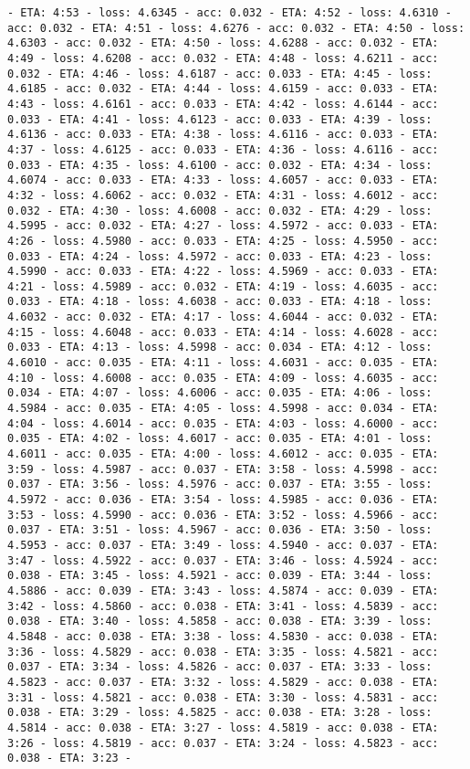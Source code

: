 \documentclass[11pt]{article}
\begin{document}
\begin{Verbatim}[commandchars=\\\{\}]
- ETA: 4:53 - loss: 4.6345 - acc: 0.032 - ETA: 4:52 - loss: 4.6310 - acc: 0.032 - ETA: 4:51 - loss: 4.6276 - acc: 0.032 - ETA: 4:50 - loss: 4.6303 - acc: 0.032 - ETA: 4:50 - loss: 4.6288 - acc: 0.032 - ETA: 4:49 - loss: 4.6208 - acc: 0.032 - ETA: 4:48 - loss: 4.6211 - acc: 0.032 - ETA: 4:46 - loss: 4.6187 - acc: 0.033 - ETA: 4:45 - loss: 4.6185 - acc: 0.032 - ETA: 4:44 - loss: 4.6159 - acc: 0.033 - ETA: 4:43 - loss: 4.6161 - acc: 0.033 - ETA: 4:42 - loss: 4.6144 - acc: 0.033 - ETA: 4:41 - loss: 4.6123 - acc: 0.033 - ETA: 4:39 - loss: 4.6136 - acc: 0.033 - ETA: 4:38 - loss: 4.6116 - acc: 0.033 - ETA: 4:37 - loss: 4.6125 - acc: 0.033 - ETA: 4:36 - loss: 4.6116 - acc: 0.033 - ETA: 4:35 - loss: 4.6100 - acc: 0.032 - ETA: 4:34 - loss: 4.6074 - acc: 0.033 - ETA: 4:33 - loss: 4.6057 - acc: 0.033 - ETA: 4:32 - loss: 4.6062 - acc: 0.032 - ETA: 4:31 - loss: 4.6012 - acc: 0.032 - ETA: 4:30 - loss: 4.6008 - acc: 0.032 - ETA: 4:29 - loss: 4.5995 - acc: 0.032 - ETA: 4:27 - loss: 4.5972 - acc: 0.033 - ETA: 4:26 - loss: 4.5980 - acc: 0.033 - ETA: 4:25 - loss: 4.5950 - acc: 0.033 - ETA: 4:24 - loss: 4.5972 - acc: 0.033 - ETA: 4:23 - loss: 4.5990 - acc: 0.033 - ETA: 4:22 - loss: 4.5969 - acc: 0.033 - ETA: 4:21 - loss: 4.5989 - acc: 0.032 - ETA: 4:19 - loss: 4.6035 - acc: 0.033 - ETA: 4:18 - loss: 4.6038 - acc: 0.033 - ETA: 4:18 - loss: 4.6032 - acc: 0.032 - ETA: 4:17 - loss: 4.6044 - acc: 0.032 - ETA: 4:15 - loss: 4.6048 - acc: 0.033 - ETA: 4:14 - loss: 4.6028 - acc: 0.033 - ETA: 4:13 - loss: 4.5998 - acc: 0.034 - ETA: 4:12 - loss: 4.6010 - acc: 0.035 - ETA: 4:11 - loss: 4.6031 - acc: 0.035 - ETA: 4:10 - loss: 4.6008 - acc: 0.035 - ETA: 4:09 - loss: 4.6035 - acc: 0.034 - ETA: 4:07 - loss: 4.6006 - acc: 0.035 - ETA: 4:06 - loss: 4.5984 - acc: 0.035 - ETA: 4:05 - loss: 4.5998 - acc: 0.034 - ETA: 4:04 - loss: 4.6014 - acc: 0.035 - ETA: 4:03 - loss: 4.6000 - acc: 0.035 - ETA: 4:02 - loss: 4.6017 - acc: 0.035 - ETA: 4:01 - loss: 4.6011 - acc: 0.035 - ETA: 4:00 - loss: 4.6012 - acc: 0.035 - ETA: 3:59 - loss: 4.5987 - acc: 0.037 - ETA: 3:58 - loss: 4.5998 - acc: 0.037 - ETA: 3:56 - loss: 4.5976 - acc: 0.037 - ETA: 3:55 - loss: 4.5972 - acc: 0.036 - ETA: 3:54 - loss: 4.5985 - acc: 0.036 - ETA: 3:53 - loss: 4.5990 - acc: 0.036 - ETA: 3:52 - loss: 4.5966 - acc: 0.037 - ETA: 3:51 - loss: 4.5967 - acc: 0.036 - ETA: 3:50 - loss: 4.5953 - acc: 0.037 - ETA: 3:49 - loss: 4.5940 - acc: 0.037 - ETA: 3:47 - loss: 4.5922 - acc: 0.037 - ETA: 3:46 - loss: 4.5924 - acc: 0.038 - ETA: 3:45 - loss: 4.5921 - acc: 0.039 - ETA: 3:44 - loss: 4.5886 - acc: 0.039 - ETA: 3:43 - loss: 4.5874 - acc: 0.039 - ETA: 3:42 - loss: 4.5860 - acc: 0.038 - ETA: 3:41 - loss: 4.5839 - acc: 0.038 - ETA: 3:40 - loss: 4.5858 - acc: 0.038 - ETA: 3:39 - loss: 4.5848 - acc: 0.038 - ETA: 3:38 - loss: 4.5830 - acc: 0.038 - ETA: 3:36 - loss: 4.5829 - acc: 0.038 - ETA: 3:35 - loss: 4.5821 - acc: 0.037 - ETA: 3:34 - loss: 4.5826 - acc: 0.037 - ETA: 3:33 - loss: 4.5823 - acc: 0.037 - ETA: 3:32 - loss: 4.5829 - acc: 0.038 - ETA: 3:31 - loss: 4.5821 - acc: 0.038 - ETA: 3:30 - loss: 4.5831 - acc: 0.038 - ETA: 3:29 - loss: 4.5825 - acc: 0.038 - ETA: 3:28 - loss: 4.5814 - acc: 0.038 - ETA: 3:27 - loss: 4.5819 - acc: 0.038 - ETA: 3:26 - loss: 4.5819 - acc: 0.037 - ETA: 3:24 - loss: 4.5823 - acc: 0.038 - ETA: 3:23 - 
\end{Verbatim}
\end{document}
